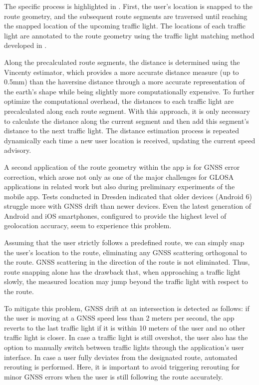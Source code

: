 The specific process is highlighted in . First, the user's location is snapped to the route geometry, and the subsequent route segments are traversed until reaching the snapped location of the upcoming traffic light. The locations of each traffic light are annotated to the route geometry using the traffic light matching method developed in .

Along the precalculated route segments, the distance is determined using the Vincenty estimator, which provides a more accurate distance measure (up to 0.5mm) than the haversine distance through a more accurate representation of the earth's shape while being slightly more computationally expensive. To further optimize the computational overhead, the distances to each traffic light are precalculated along each route segment. With this approach, it is only necessary to calculate the distance along the current segment and then add this segment's distance to the next traffic light. The distance estimation process is repeated dynamically each time a new user location is received, updating the current speed advisory.

A second application of the route geometry within the app is for GNSS error correction, which arose not only as one of the major challenges for GLOSA applications in related work but also during preliminary experiments of the mobile app. Tests conducted in Dresden indicated that older devices (Android 6) struggle more with GNSS drift than newer devices. Even the latest generation of Android and iOS smartphones, configured to provide the highest level of geolocation accuracy, seem to experience this problem.

Assuming that the user strictly follows a predefined route, we can simply snap the user's location to the route, eliminating any GNSS scattering orthogonal to the route. GNSS scattering in the direction of the route is not eliminated. Thus, route snapping alone has the drawback that, when approaching a traffic light slowly, the measured location may jump beyond the traffic light with respect to the route. 

To mitigate this problem, GNSS drift at an intersection is detected as follows: if the user is moving at a GNSS speed less than 2 meters per second, the app reverts to the last traffic light if it is within 10 meters of the user and no other traffic light is closer. In case a traffic light is still overshot, the user also has the option to manually switch between traffic lights through the application's user interface. In case a user fully deviates from the designated route, automated rerouting is performed. Here, it is important to avoid triggering rerouting for minor GNSS errors when the user is still following the route accurately.

